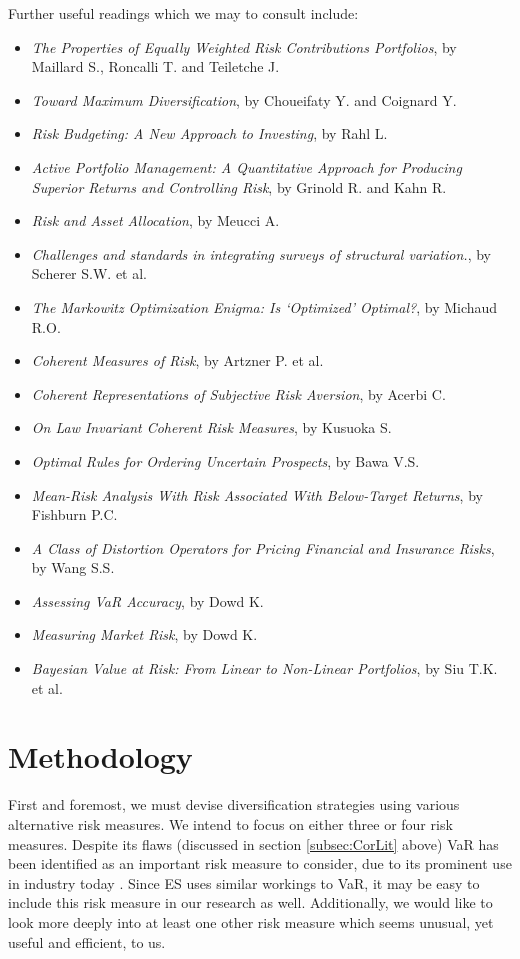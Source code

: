 \documentclass[12pt,a4paper]{article}
\newcommand{\bi}{\begin{itemize}}
\newcommand{\ei}{\end{itemize}}
\begin{document}
Further useful readings which we may to consult include: 
\bi
\item  \textit{The Properties of Equally Weighted Risk Contributions Portfolios}, by Maillard S., Roncalli T. and Teiletche J. 
\item \textit{Toward Maximum Diversification}, by Choueifaty Y. and Coignard Y.
\item \textit{Risk Budgeting: A New Approach to Investing}, by Rahl L.
\item \textit{Active Portfolio Management: A Quantitative Approach for Producing Superior Returns and Controlling Risk}, by Grinold R. and Kahn R.
\item \textit{Risk and Asset Allocation}, by Meucci A.
\item \textit{Challenges and standards in integrating surveys of structural variation.}, by Scherer S.W. et al.
\item \textit{The Markowitz Optimization Enigma: Is ‘Optimized’ Optimal?}, by Michaud R.O.
\item \textit{Coherent Measures of Risk}, by Artzner P. et al.
\item \textit{Coherent Representations of Subjective Risk Aversion}, by Acerbi C. 
\item  \textit{On Law Invariant Coherent Risk Measures}, by Kusuoka S.
\item  \textit{Optimal Rules for Ordering Uncertain Prospects}, by Bawa V.S.
\item \textit{Mean-Risk Analysis With Risk Associated With Below-Target Returns}, by Fishburn P.C.
\item  \textit{A Class of Distortion Operators for Pricing Financial and Insurance Risks}, by Wang S.S.
\item  \textit{Assessing VaR Accuracy}, by Dowd K.
\item  \textit{Measuring Market Risk}, by Dowd K. 
\item \textit{Bayesian Value at Risk: From Linear to Non-Linear Portfolios}, by Siu T.K. et al.
\ei

\section{Methodology}
\label{sec:Method}

First and foremost, we must devise diversification strategies using various alternative risk measures. We intend to focus on either three or four risk measures. Despite its flaws (discussed in section \ref{subsec:CorLit} above) VaR has been identified as an important risk measure to consider, due to its prominent use in industry today \citep{consiglirisk}. Since ES uses similar workings to VaR, it may be easy to include this risk measure in our research as well. Additionally, we would like to look more deeply into at least one other risk measure which seems unusual, yet useful and efficient, to us.
\end{document}

